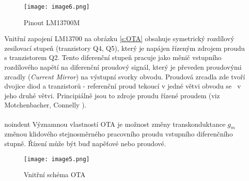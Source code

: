 \begin{figure}[h]
\centering
\texttt{[image: image6.png]}
\caption[Pinout LM13700M]{Pinout LM13700M \cite{17} \label{s:PIN}}
\end{figure}
\noindent Vnitřní zapojení LM13700 na obrázku \ref{s:OTA} obsahuje symetrický rozdílový zesilovací stupeň (tranzistory Q4, Q5), který je napájen řízeným zdrojem proudu s tranzistorem Q2. Tento diferenční stupeň pracuje jako měnič vstupního rozdílového napětí na diferenční proudový signál, který je převeden proudovými zrcadly (\textit{Current Mirror}) na výstupní svorky obvodu. Proudová zrcadla zde tvoří dvojice diod a tranzistorů - referenční proud tekoucí v jedné větvi obvodu se  ~v jeho druhé větvi. Principiálně jsou to zdroje proudu řízené proudem (viz Motchenbacher, Connelly \cite{20}).
\\
\\noindent Významnou vlastností OTA je možnost změny transkonduktance $g_m$ změnou klidového stejnosměrného pracovního proudu vstupního diferenčního stupně. Řízení může být buď napěťové nebo proudové.
\begin{figure}[h]
\centering
\texttt{[image: image5.png]}
\caption[Vnitřní schéma OTA]{Vnitřní schéma OTA \cite{17}\label{sec:OTA}}
\end{figure}